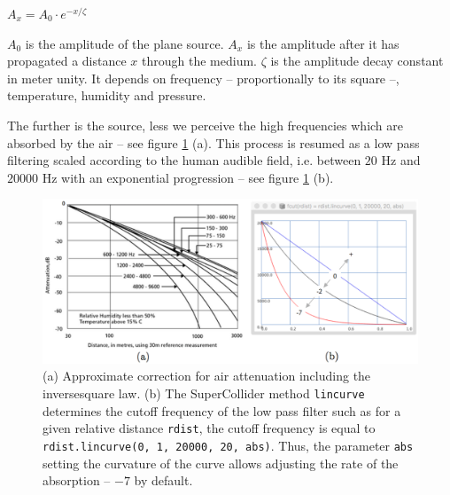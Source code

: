 \documentclass{book}
\begin{document}
\bigskip

$A_x=A_0\cdot e^{- x/\zeta}$ 

\bigskip

$A_0$ is the amplitude of the plane source. $A_x$ is the amplitude after it has propagated a distance $x$ through the medium.
$\zeta$ is the amplitude decay constant in meter unity. It depends on frequency -- proportionally to its square --, temperature, humidity and pressure.

\bigskip

The further is the source, less we perceive the high frequencies which are absorbed by the air -- see figure \ref{fig:fcut} (a). This process is resumed as a low pass filtering scaled according to the human audible field, i.e. between $20$ Hz and $20000$ Hz with an exponential progression -- see figure \ref{fig:fcut} (b).

\begin{figure}[H]
\begin{center}
\includegraphics[width=\textwidth]{img/6785}
\caption{(a) \citep{bk} Approximate correction for air attenuation including the inversesquare law. (b) The SuperCollider method \texttt{lincurve} determines the cutoff frequency of the low pass filter such as for a given relative distance \texttt{rdist}, the cutoff frequency is equal to \texttt{rdist.lincurve(0, 1, 20000, 20, abs)}. Thus, the parameter \texttt{abs} setting the curvature of the curve allows adjusting the rate of the absorption -- $-7$ by default. 
}
\label{fig:fcut}
\end{center}
\end{figure}


\newpage
\end{document}
